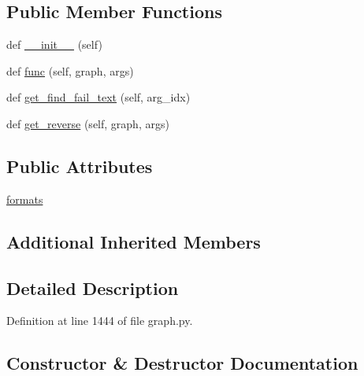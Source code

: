 \subsection*{Public Member Functions}
\begin{DoxyCompactItemize}
\item 
def \hyperlink{classlight__chats_1_1graph_1_1GiveObjectFunction_a1ad77504961b2163c1ec8789c89022b9}{\+\_\+\+\_\+init\+\_\+\+\_\+} (self)
\item 
def \hyperlink{classlight__chats_1_1graph_1_1GiveObjectFunction_a8debb985c3252b31e92837bb6cb0d227}{func} (self, graph, args)
\item 
def \hyperlink{classlight__chats_1_1graph_1_1GiveObjectFunction_a53aa62498243387346fe8e3bae0434e2}{get\+\_\+find\+\_\+fail\+\_\+text} (self, arg\+\_\+idx)
\item 
def \hyperlink{classlight__chats_1_1graph_1_1GiveObjectFunction_a5339f851bf119b82f9f8d8abbbeeabb3}{get\+\_\+reverse} (self, graph, args)
\end{DoxyCompactItemize}
\subsection*{Public Attributes}
\begin{DoxyCompactItemize}
\item 
\hyperlink{classlight__chats_1_1graph_1_1GiveObjectFunction_a0fec6f9aa2b89ddc4ab44917d13eaaf6}{formats}
\end{DoxyCompactItemize}
\subsection*{Additional Inherited Members}


\subsection{Detailed Description}
\begin{DoxyVerb}
\end{DoxyVerb}
 

Definition at line 1444 of file graph.\+py.



\subsection{Constructor \& Destructor Documentation}
\mbox{\label{classlight__chats_1_1graph_1_1GiveObjectFunction_a1ad77504961b2163c1ec8789c89022b9}} 
